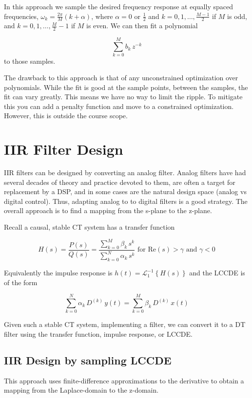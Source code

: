 \documentclass{article}
\begin{document}
In this approach we sample the desired frequency response at equally spaced frequencies, $\omega_k = \frac{2\pi}{M}(k+\alpha)$, where $\alpha = 0$ or $\frac{1}{2}$ and $k = 0,1,\ldots, \frac{M-1}{2}$ if $M$ is odd, and $k = 0,1,\ldots, \frac{M}{2}-1$ if $M$ is even. We can then fit a polynomial

\[
\sum\limits_{k=0}^{M} b_k\, z^{-k}
\]
to those samples.

The drawback to this approach is that of any unconstrained optimization over polynomials. While the fit is good at the sample points, between the samples, the fit can vary greatly. This means we have no way to limit the ripple. To mitigate this you can add a penalty function and move to a constrained optimization. However, this is outside the course scope.

\section{IIR Filter Design}

IIR filters can be designed by converting an analog filter. Analog filters have had several decades of theory and practice devoted to them, are often a target for replacement by a DSP, and in some cases are the natural design space (analog vs digital control). Thus, adapting analog to to digital filters is a good strategy. The overall approach is to find a mapping from the s-plane to the z-plane.

Recall a causal, stable CT system has a transfer function

\[
H(s) = \frac{P(s)}{Q(s)} = \frac{\sum\limits_{k = 0}^{M}\beta_k\, s^k}{\sum\limits_{k = 0}^{N}\alpha_k\, s^k} \mbox{ for } \mbox{Re}(s) > \gamma \mbox{ and } \gamma < 0
\]

Equivalently the impulse response is $h(t) = \mathcal{L}_1^{-1}\left\{ H(s) \right\}$ and the LCCDE is of the form

\[
\sum\limits_{k = 0}^{N}\alpha_k\, D^{(k)}\, y(t) = \sum\limits_{k = 0}^{M}\beta_k\, D^{(k)}\, x(t) 
\]

Given such a stable CT system, implementing a filter, we can convert it to a DT filter using the transfer function, impulse response, or LCCDE.

\subsection{IIR Design by sampling LCCDE}

This approach uses finite-difference approximations to the derivative to obtain a mapping from the Laplace-domain to the z-domain.
\end{document}
